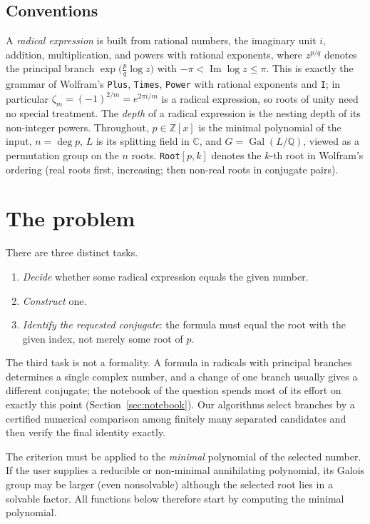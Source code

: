 \documentclass[11pt,a4paper]{article}
\theoremstyle{definition}
\theoremstyle{remark}
\newcommand{\Q}{\mathbb{Q}}
\newcommand{\Z}{\mathbb{Z}}
\newcommand{\C}{\mathbb{C}}
\newcommand{\Gal}{\operatorname{Gal}}
\newcommand{\code}[1]{\texttt{#1}}
\newcommand{\Root}{\code{Root}}
\begin{document}
\subsection{Conventions}\label{sec:conventions}

A \emph{radical expression} is built from rational numbers, the imaginary unit $i$,
addition, multiplication, and powers with rational exponents, where $z^{p/q}$ denotes
the principal branch $\exp\bigl(\tfrac{p}{q}\log z\bigr)$ with $-\pi<\operatorname{Im}\log z\le\pi$.
This is exactly the grammar of Wolfram's \code{Plus}, \code{Times}, \code{Power} with
rational exponents and \code{I}; in particular $\zeta_m=(-1)^{2/m}=e^{2\pi i/m}$ is a
radical expression, so roots of unity need no special treatment.  The \emph{depth} of a
radical expression is the nesting depth of its non-integer powers.  Throughout,
$p\in\Z[x]$ is the minimal polynomial of the input, $n=\deg p$, $L$ is its splitting
field in $\C$, and $G=\Gal(L/\Q)$, viewed as a permutation group on the $n$ roots.
\Root{}$[p,k]$ denotes the $k$-th root in Wolfram's ordering (real roots first,
increasing; then non-real roots in conjugate pairs).

\section{The problem}\label{sec:problem}

There are three distinct tasks.
\begin{enumerate}[nosep]
\item \emph{Decide} whether some radical expression equals the given number.
\item \emph{Construct} one.
\item \emph{Identify the requested conjugate}: the formula must equal the root with the
given index, not merely some root of $p$.
\end{enumerate}
The third task is not a formality.  A formula in radicals with principal branches
determines a single complex number, and a change of one branch usually gives a different
conjugate; the notebook of the question spends most of its effort on exactly this point
(Section~\ref{sec:notebook}).  Our algorithms select branches by a certified numerical
comparison among finitely many separated candidates and then verify the final identity
exactly.

The criterion must be applied to the \emph{minimal} polynomial of the selected number.
If the user supplies a reducible or non-minimal annihilating polynomial, its Galois
group may be larger (even nonsolvable) although the selected root lies in a solvable
factor.  All functions below therefore start by computing the minimal polynomial.
\end{document}
